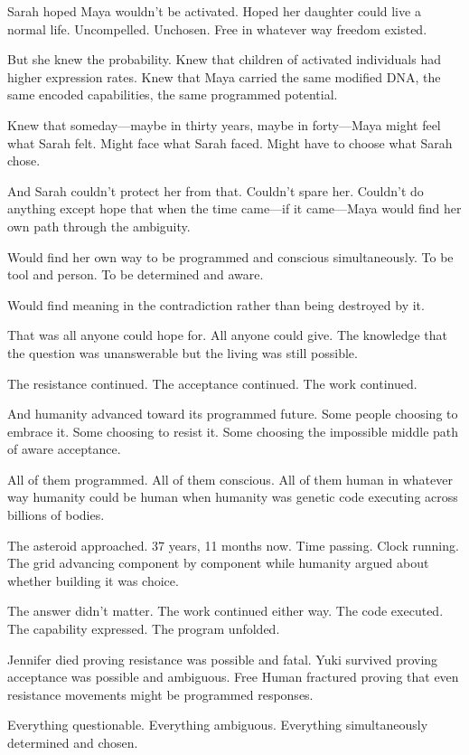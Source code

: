 Sarah hoped Maya wouldn't be activated. Hoped her daughter could live a normal life. Uncompelled. Unchosen. Free in whatever way freedom existed.

But she knew the probability. Knew that children of activated individuals had higher expression rates. Knew that Maya carried the same modified DNA, the same encoded capabilities, the same programmed potential.

Knew that someday—maybe in thirty years, maybe in forty—Maya might feel what Sarah felt. Might face what Sarah faced. Might have to choose what Sarah chose.

And Sarah couldn't protect her from that. Couldn't spare her. Couldn't do anything except hope that when the time came—if it came—Maya would find her own path through the ambiguity.

Would find her own way to be programmed and conscious simultaneously. To be tool and person. To be determined and aware.

Would find meaning in the contradiction rather than being destroyed by it.

That was all anyone could hope for. All anyone could give. The knowledge that the question was unanswerable but the living was still possible.

The resistance continued. The acceptance continued. The work continued.

And humanity advanced toward its programmed future. Some people choosing to embrace it. Some choosing to resist it. Some choosing the impossible middle path of aware acceptance.

All of them programmed. All of them conscious. All of them human in whatever way humanity could be human when humanity was genetic code executing across billions of bodies.

The asteroid approached. 37 years, 11 months now. Time passing. Clock running. The grid advancing component by component while humanity argued about whether building it was choice.

The answer didn't matter. The work continued either way. The code executed. The capability expressed. The program unfolded.

Jennifer died proving resistance was possible and fatal. Yuki survived proving acceptance was possible and ambiguous. Free Human fractured proving that even resistance movements might be programmed responses.

Everything questionable. Everything ambiguous. Everything simultaneously determined and chosen.

